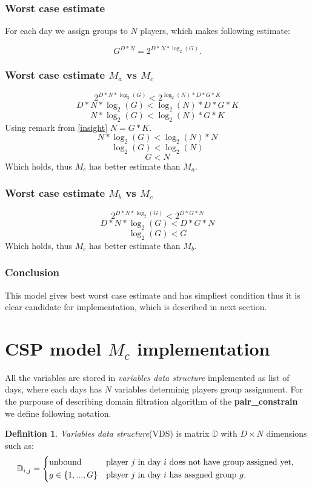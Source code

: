 \documentclass[a4paper]{article}
\theoremstyle{definition}
\newtheorem{definition}{Definition}[section]
\theoremstyle{remark}
\newcommand{\mdef}[2]{
	\theoremstyle{definition}
	\begin{definition}{#1}
	#2
	\end{definition}
}
\newcommand{\ccc}[1]{{\mbox{\fontfamily{lmtt}\selectfont\textbf{#1}}}}
\begin{document}
\subsubsection{Worst case estimate}
For each day we assign groups to  $N$ players, which makes following estimate:

$$ G^{D*N} = 2^{D*N*\log_2(G)}.$$

\subsubsection{Worst case estimate $M_a$ vs $M_c$}
$$ 2^{D*N*\log_2(G)} < 2^{\log_2{(N)}*D*G*K}$$
$$ D*N*\log_2(G) < \log_2{(N)}*D*G*K $$
$$ N*\log_2(G) < \log_2{(N)}*G*K $$
Using remark from \ref{insight} $N = G*K$.
$$ N*\log_2(G) < \log_2{(N)}*N $$
$$ \log_2(G) < \log_2{(N)} $$
$$ G < N $$
Which holds, thus $M_c$ has better estimate than $M_a$.


\subsubsection{Worst case estimate $M_b$ vs $M_c$}
$$ 2^{D*N*\log_2(G)} < 2^{D*G*N}$$
$$ D*N*\log_2(G) < D*G*N$$
$$ \log_2(G) < G$$
Which holds, thus $M_c$ has better estimate than $M_b$.


\subsubsection{Conclusion}
This model gives best worst case estimate and has simpliest condition thus 
it is clear candidate for implementation, which is described in next section.

\section{CSP model $M_c$ implementation}
All the variables are stored in \textit{variables data structure} implemented as list
of days, where each days has $N$ variables determinig players group assignment.
For the purpouse of describing domain filtration algorithm of the 
\ccc{pair\_constrain} we define following notation.

\mdef{}{
\textit{Variables data structure}(VDS) is matrix $\mathbb{D}$ with $D \times N$ dimensions such as:
\begin{equation}
	\mathbb{D}_{i,j} = 
	\begin{cases*}
		\text{unbound}	& player $j$ in day $i$ does not have group assigned yet, \\
		g \in \{1,...,G\}        & player $j$ in day $i$ has assgned group $g$. 
	\end{cases*}
\end{equation}
}
\end{document}
